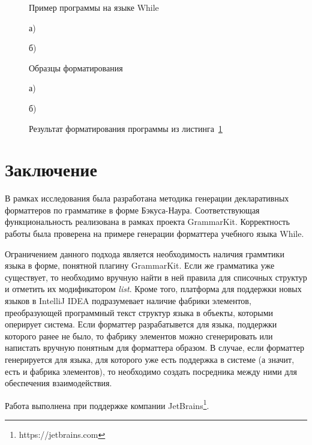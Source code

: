 \documentclass[conference]{IEEEtran}
\begin{document}
\begin{figure}[h]
	\centering
	
	\caption{Пример программы на языке While}
	\label{whileProg}
\end{figure}

\begin{figure}[ht]
\noindent\begin{minipage}{.2\textwidth}
    
\caption*{а)}    
\end{minipage}\hfill
\begin{minipage}{.2\textwidth}
    
\caption*{б)}    
\end{minipage}
\caption{Образцы форматирования}    
\label{whileTs}
\end{figure}

\begin{figure}[ht]
\noindent\begin{minipage}{.2\textwidth}
    
\caption*{а)}    
\end{minipage}\hfill
\begin{minipage}{.2\textwidth}
    
\caption*{б)}    
\end{minipage}
\caption{Результат форматирования программы из листинга~\ref{whileProg}}
\label{whileRes}
\end{figure}

\section{Заключение}
В рамках исследования была разработана методика генерации декларативных форматтеров по грамматике в форме Бэкуса-Наура.
Соответствующая функциональность реализована в рамках проекта GrammarKit.
Корректность работы была проверена на примере генерации форматтера учебного языка While.

Ограничением данного подхода является необходимость наличия граммтики языка в форме, понятной плагину GrammarKit. 
Если же грамматика уже существует, то необходимо вручную найти в ней правила для списочных структур и отметить их модификатором \emph{list}.
Кроме того, платформа для поддержки новых языков в IntelliJ IDEA подразумевает наличие фабрики элементов, преобразующей программный текст структур языка в объекты, которыми оперирует система.
Если форматтер разрабатывется для языка, поддержки которого ранее не было, то фабрику элементов можно сгенерировать или напистать вручную понятным для форматтера образом.
В случае, если форматтер генерируется для языка, для которого уже есть поддержка в системе (а значит, есть и фабрика элементов), то необходимо создать посредника между ними для обеспечения взаимодействия.

Работа выполнена при поддержке компании JetBrains\footnote{https://jetbrains.com}.

\nocite{*}

\printbibliography
\end{document}

